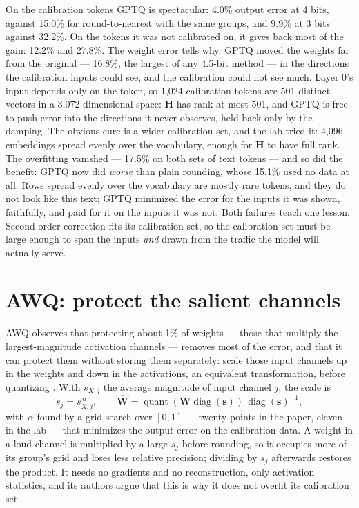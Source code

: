 On the calibration tokens GPTQ is spectacular: 4.0\% output error at 4 bits,
against 15.0\% for round-to-nearest with the same groups, and 9.9\% at 3 bits
against 32.2\%. On the tokens it was not calibrated on, it gives back most of
the gain: 12.2\% and 27.8\%. The weight error tells why. GPTQ moved the weights
far from the original --- 16.8\%, the largest of any 4.5-bit method --- in the
directions the calibration inputs could see, and the calibration could not
see much. Layer 0's input depends only on the token, so 1,024 calibration
tokens are 501 distinct vectors in a 3,072-dimensional space: $\mathbf{H}$ has
rank at most 501, and GPTQ is free to push error into the directions it never
observes, held back only by the damping. The obvious cure is a wider
calibration set, and the lab tried it: 4,096 embeddings spread evenly over the
vocabulary, enough for $\mathbf{H}$ to have full rank. The overfitting
vanished --- 17.5\% on both sets of text tokens --- and so did the benefit:
GPTQ now did \emph{worse} than plain rounding, whose 15.1\% used no data at all.
Rows spread evenly over the vocabulary are mostly rare tokens, and they do not
look like this text; GPTQ minimized the error for the inputs it was shown,
faithfully, and paid for it on the inputs it was not. Both failures teach one
lesson. Second-order correction fits its calibration set, so the calibration
set must be large enough to span the inputs \emph{and} drawn from the traffic
the model will actually serve.

\section{AWQ: protect the salient channels}

AWQ observes that protecting about 1\% of weights --- those that multiply the
largest-magnitude activation channels --- removes most of the error, and that
it can protect them without storing them separately: scale those input
channels up in the weights and down in the activations, an equivalent
transformation, before quantizing \cite{lin2024awq}. With $s_{X,j}$ the average
magnitude of input channel $j$, the scale is
\begin{equation}
s_j = s_{X,j}^{\,\alpha},\qquad
\hat{\mathbf{W}} = \operatorname{quant}(\mathbf{W}\operatorname{diag}(\mathbf{s}))\,
\operatorname{diag}(\mathbf{s})^{-1},
\label{eq:awq}
\end{equation}
with $\alpha$ found by a grid search over $[0, 1]$ --- twenty points in the
paper, eleven in the lab --- that minimizes the output error on the calibration
data. A weight in a loud channel is multiplied by a large $s_j$ before rounding,
so it occupies more of its group's grid and loses less relative precision;
dividing by $s_j$ afterwards restores the product. It needs no gradients and no
reconstruction, only activation statistics, and its authors argue that this
is why it does not overfit its calibration set.

